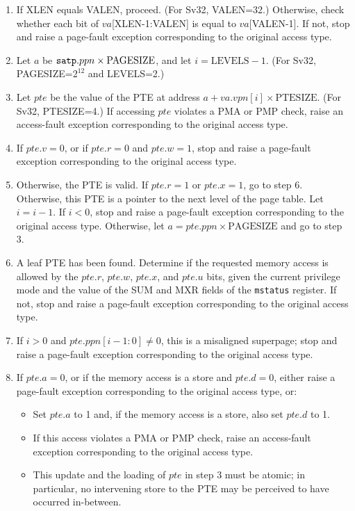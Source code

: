 \begin{enumerate}

\item If XLEN equals VALEN, proceed.
  (For Sv32, VALEN=32.)
  Otherwise, check whether each bit of $va$[XLEN-1:VALEN] is equal to
  $va$[VALEN-1].
  If not, stop and raise a page-fault exception corresponding to the
  original access type.

\item Let $a$ be ${\tt satp}.ppn \times \textrm{PAGESIZE}$, and let $i=\textrm{LEVELS} - 1$. (For Sv32, PAGESIZE=$2^{12}$ and LEVELS=2.)

\item Let $pte$ be the value of the PTE at address
  $a+va.vpn[i]\times \textrm{PTESIZE}$. (For Sv32, PTESIZE=4.)
  If accessing $pte$ violates a PMA or PMP check, raise an
  access-fault exception corresponding to the original access type.

\item If $pte.v=0$, or if $pte.r=0$ and $pte.w=1$, stop and raise a
  page-fault exception corresponding to the original access type.

\item Otherwise, the PTE is valid.
  If $pte.r=1$ or $pte.x=1$, go to step 6.
  Otherwise, this PTE is a pointer to the next level of the page table.  Let
  $i=i-1$.  If $i<0$, stop and raise a page-fault exception
  corresponding to the original access type.  Otherwise, let
  $a=pte.ppn \times \textrm{PAGESIZE}$ and go to step 3.

\item A leaf PTE has been found.  Determine if the requested memory access is
  allowed by the $pte.r$, $pte.w$, $pte.x$, and $pte.u$ bits, given the
  current privilege mode and the value of the SUM and MXR fields of
  the {\tt mstatus} register.  If not, stop and raise a page-fault
  exception corresponding to the original access type.

\item If $i>0$ and $pte.ppn[i-1:0]\neq 0$, this is a misaligned superpage;
  stop and raise a page-fault exception corresponding to the original access type.

\item If $pte.a=0$, or if the memory access is a store and $pte.d=0$, either
  raise a page-fault exception corresponding to the original access type, or:
  \begin{itemize}
  \item Set $pte.a$ to 1 and, if the memory access is a store, also set
    $pte.d$ to 1.
  \item If this access violates a PMA or PMP check, raise an access-fault exception
    corresponding to the original access type.
  \item This update and the loading of $pte$ in step 3 must be atomic; in
    particular, no intervening store to the PTE may be perceived to have
    occurred in-between.
  \end{itemize}


\end{enumerate}
